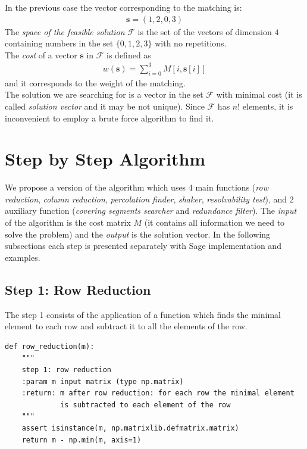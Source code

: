 \documentclass[12pt]{ClasseMatematicamente}
\begin{document}
In the previous case the vector corresponding to the matching is:
\begin{align*}
 \mathbf{s} = (1,2,0,3)
\end{align*} 
The \emph{space of the feasible solution} $\mathcal{F}$ is the set of the vectors of dimension $4$ containing numbers in the set $\lbrace 0,1,2,3\rbrace $ with no repetitions.\\
The \emph{cost} of a vector $\mathbf{s}$ in $\mathcal{F}$ is defined as 
\begin{align*}
 w(\mathbf{s}) = \sum_{i=0}^{3} M[i,\mathbf{s}[i]]
\end{align*}
and it corresponds to the weight of the matching.\\
The solution we are searching for is a vector in the set $\mathcal{F}$ with minimal cost (it is called \emph{solution vector} and it may be not unique). Since $\mathcal{F}$ has $n!$ elements, it is inconvenient to employ a brute force algorithm to find it.


\section*{Step by Step Algorithm}\label{se:stepbystep}
We propose a version of the algorithm which uses 4 main functions (\emph{row reduction}, \emph{column reduction}, \emph{percolation finder}, \emph{shaker}, \emph{resolvability test}), and 2 auxiliary function (\emph{covering segments searcher} and \emph{redundance filter}).
The \emph{input} of the algorithm is the cost matrix $M$ (it contains all information we need to solve the problem) and the \emph{output} is the solution vector.
In the following subsections each step is presented separately with Sage implementation and examples. 

\subsection*{Step 1: Row Reduction}
The step 1 consists of the application of a function which finds the minimal element to each row and subtract it to all the elements of the row.

\begin{small}
\begin{lstlisting}
def row_reduction(m):
	"""
	step 1: row reduction
	:param m input matrix (type np.matrix)
	:return: m after row reduction: for each row the minimal element 
	         is subtracted to each element of the row
	"""
	assert isinstance(m, np.matrixlib.defmatrix.matrix)
	return m - np.min(m, axis=1)
\end{lstlisting}
\end{small}
\end{document}
